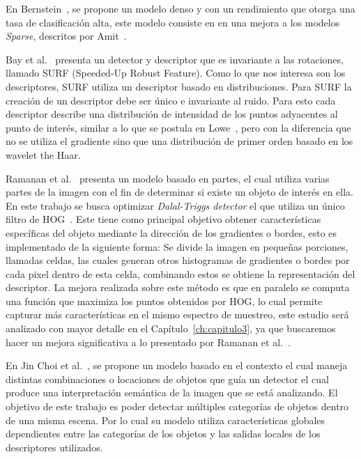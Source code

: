 En Bernstein~\cite{statistical2005}, se propone un modelo denso y con un rendimiento que otorga una tasa de clasificación alta, este modelo consiste en en una mejora a los modelos \textit{Sparse}, descritos por Amit~\cite{2dobject2002}.

Bay et al.~\cite{surf2008} presenta un detector y descriptor que es invariante a las rotaciones, llamado SURF (Speeded-Up Robust Feature). Como lo que nos interesa son los descriptores, SURF utiliza un descriptor basado en distribuciones. Para SURF la creación de un descriptor debe ser único e invariante al ruido. Para esto cada descriptor describe una distribución de intensidad de los puntos adyacentes al punto de interés, similar a lo que se postula en Lowe~\cite{sift2004}, pero con la diferencia que no se utiliza el gradiente sino que una distribución de primer orden basado en los wavelet the Haar.

Ramanan et al.~\cite{Felzenszwalb2010} presenta un modelo basado en partes,  el cual utiliza varias partes de la imagen con el fin de determinar si existe un objeto de interés en ella. En este trabajo se busca optimizar \textit{Dalal-Triggs detector} el que utiliza un único filtro de HOG~\cite{hog2005}. Este tiene como principal objetivo obtener características específicas del objeto mediante la dirección de los gradientes o bordes, esto es implementado de la siguiente forma: Se divide la imagen en pequeñas porciones, llamadas celdas, las cuales generan otros histogramas de gradientes o bordes por cada pixel dentro de esta celda, combinando estos se obtiene la representación del descriptor. La mejora realizada sobre este método es que en paralelo se computa una función que maximiza los puntos obtenidos por HOG, lo cual permite capturar más características en el mismo espectro de muestreo, este estudio será analizado con mayor detalle en el Capítulo~\ref{ch:capitulo3}, ya que buscaremos hacer un mejora significativa a lo presentado por Ramanan et al.~\cite{Felzenszwalb2010}.

En Jin Choi et al.~\cite{treebased2012}, se propone un modelo basado en el contexto el cual maneja distintas combinaciones o locaciones de objetos que guía un detector el cual produce una interpretación semántica de la imagen que se está analizando. El objetivo de este trabajo es poder detectar múltiples categorías de objetos dentro de una misma escena. Por lo cual su modelo utiliza características globales dependientes entre las categorías de los objetos y las salidas locales de los descriptores utilizados.

